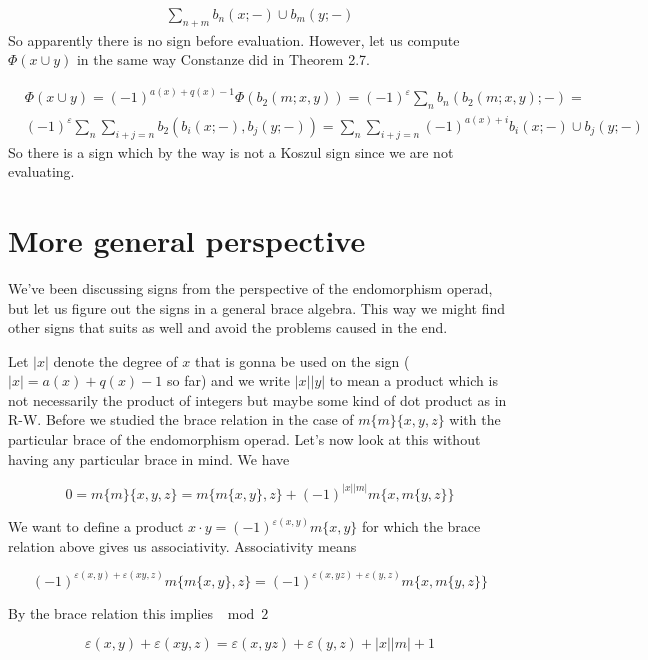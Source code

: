 \documentclass[twoside]{article}
\begin{document}
\begin{align*}
\sum_{n+m}b_n(x;-)\cup b_m(y;-)
\end{align*}
So apparently there is no sign before evaluation. However, let us compute $\Phi(x\cup y)$ in the same way Constanze did in Theorem 2.7.

\begin{align*}
&\Phi(x\cup y)=(-1)^{a(x)+q(x)-1}\Phi(b_2(m;x,y))=(-1)^{\varepsilon}\sum_n b_n(b_2(m;x,y);-)=\\
&(-1)^{\varepsilon}\sum_n\sum_{i+j=n}b_2(b_i(x;-),b_j(y;-))=\sum_n\sum_{i+j=n}(-1)^{a(x)+i}b_i(x;-)\cup b_j(y;-)
\end{align*}
So there is a sign which by the way is not a Koszul sign since we are not evaluating.

\section{More general perspective}
We've been discussing signs from the perspective of the endomorphism operad, but let us figure out the signs in a general brace algebra. This way we might find other signs that suits as well and avoid the problems caused in the end.

Let $|x|$ denote the degree of $x$ that is gonna be used on the sign ($|x|=a(x)+q(x)-1$ so far) and we write $|x||y|$ to mean a product which is not necessarily the product of integers but maybe some kind of dot product as in R-W. Before we studied the brace relation in the case of $m\{m\}\{x,y,z\}$ with the particular brace of the endomorphism operad. Let's now look at this without having any particular brace in mind. We have

$$0=m\{m\}\{x,y,z\}=m\{m\{x,y\},z\}+(-1)^{|x||m|}m\{x,m\{y,z\}\}$$

We want to define a product $x\cdot y=(-1)^{\varepsilon(x,y)}m\{x,y\}$ for which the brace relation above gives us associativity. Associativity means

$$(-1)^{\varepsilon(x,y)+\varepsilon(xy,z)}m\{m\{x,y\},z\}=(-1)^{\varepsilon(x,yz)+\varepsilon(y,z)}m\{x,m\{y,z\}\}$$

By the brace relation this implies $\mod 2$ 

\begin{equation}\label{ass-sing}%
\varepsilon(x,y)+\varepsilon(xy,z)=\varepsilon(x,yz)+\varepsilon(y,z)+|x||m|+1
\end{equation}

%
\end{document}
